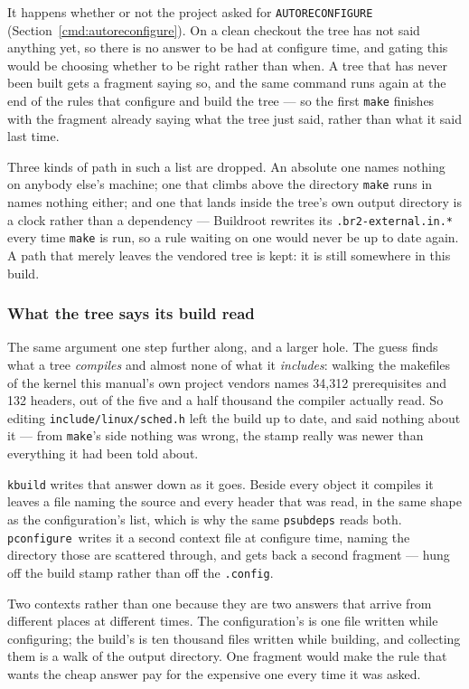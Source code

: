 \documentclass{article}
\newcommand{\pconfigure}{\texttt{pconfigure}}
\begin{document}
It happens whether or not the project asked for
\texttt{AUTORECONFIGURE} (Section~\ref{cmd:autoreconfigure}).  On a
clean checkout the tree has not said anything yet, so there is no
answer to be had at configure time, and gating this would be choosing
whether to be right rather than when.  A tree that has never been
built gets a fragment saying so, and the same command runs again at
the end of the rules that configure and build the tree --- so the
first \texttt{make} finishes with the fragment already saying what the
tree just said, rather than what it said last time.

Three kinds of path in such a list are dropped.  An absolute one names
nothing on anybody else's machine; one that climbs above the directory
\texttt{make} runs in names nothing either; and one that lands inside
the tree's own output directory is a clock rather than a dependency
--- Buildroot rewrites its \texttt{.br2-external.in.*} every time
\texttt{make} is run, so a rule waiting on one would never be up to
date again.  A path that merely leaves the vendored tree is kept: it
is still somewhere in this build.

\subsubsection{What the tree says its build read}

The same argument one step further along, and a larger hole.  The
guess finds what a tree \emph{compiles} and almost none of what it
\emph{includes}: walking the makefiles of the kernel this manual's
own project vendors names 34,312 prerequisites and 132 headers, out of
the five and a half thousand the compiler actually read.  So editing
\texttt{include/linux/sched.h} left the build up to date, and said
nothing about it --- from \texttt{make}'s side nothing was wrong, the
stamp really was newer than everything it had been told about.

\texttt{kbuild} writes that answer down as it goes.  Beside every
object it compiles it leaves a file naming the source and every header
that was read, in the same shape as the configuration's list, which is
why the same \texttt{psubdeps} reads both.  \pconfigure\ writes it a
second context file at configure time, naming the directory those are
scattered through, and gets back a second fragment --- hung off the
build stamp rather than off the \texttt{.config}.

Two contexts rather than one because they are two answers that arrive
from different places at different times.  The configuration's is one
file written while configuring; the build's is ten thousand files
written while building, and collecting them is a walk of the output
directory.  One fragment would make the rule that wants the cheap
answer pay for the expensive one every time it was asked.
\end{document}
